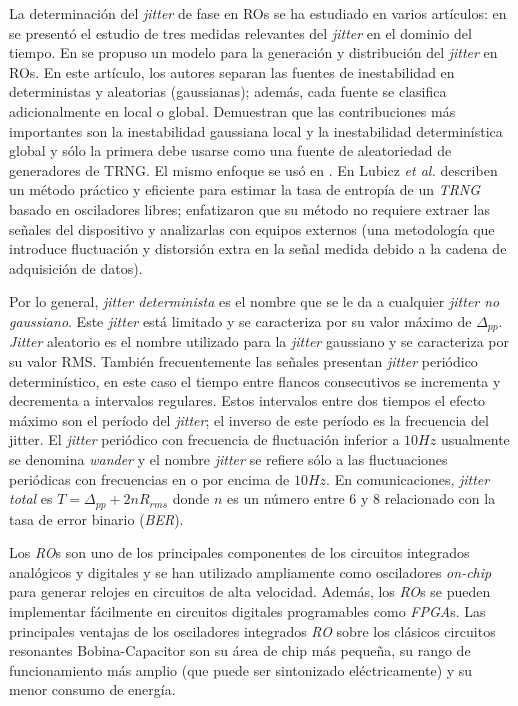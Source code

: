 La determinación del \textit{jitter} de fase en ROs se ha estudiado en varios artículos: en \cite{McNeill1997} se presentó el estudio de tres medidas relevantes del \textit{jitter} en el dominio del tiempo.
En \cite{Valtchanov2008} se propuso un modelo para la generación y distribución del \textit{jitter} en ROs.
En este artículo, los autores separan las fuentes de inestabilidad en deterministas y aleatorias (gaussianas); además, cada fuente se clasifica adicionalmente en local o global.
Demuestran que las contribuciones más importantes son la inestabilidad gaussiana local y la inestabilidad determinística global y sólo la primera debe usarse como una fuente de aleatoriedad de generadores de TRNG.
El mismo enfoque se usó en \cite{Fischer2008, Valtchanov2010, Baudet2011, Jessa2011}.
En \cite{Lubicz2014} Lubicz \textit{et al.} describen un método práctico y eficiente para estimar la tasa de entropía de un \emph{TRNG} basado en osciladores libres; enfatizaron que su método no requiere extraer las señales del dispositivo y analizarlas con equipos externos (una metodología que introduce fluctuación y distorsión extra en la señal medida debido a la cadena de adquisición de datos).

Por lo general, \emph{jitter determinista} es el nombre que se le da a cualquier \emph{jitter no gaussiano}.
Este \emph{jitter} está limitado y se caracteriza por su valor máximo de $\Delta_{pp}$.
\textit{Jitter} aleatorio es el nombre utilizado para la \textit{jitter} gaussiano y se caracteriza por su valor RMS.
También frecuentemente las señales presentan \textit{jitter} periódico determinístico, en este caso el tiempo entre flancos consecutivos se incrementa y decrementa a intervalos regulares.
Estos intervalos entre dos tiempos el efecto máximo son el período del \textit{jitter}; el inverso de este período  es la frecuencia del jitter.
El \textit{jitter} periódico con frecuencia de fluctuación inferior a $10 Hz$ usualmente se denomina \emph{wander} y el nombre \emph{jitter} se refiere sólo a las fluctuaciones periódicas con frecuencias en o por encima de $10 Hz$.
En comunicaciones, \emph{jitter total} es $T = \Delta_{pp} + 2nR_{rms}$ donde $n$ es un número entre $6$ y $8$ relacionado con la tasa de error binario (\emph{BER}).

Los \emph{RO}s son uno de los principales componentes de los circuitos integrados analógicos y digitales y se han utilizado ampliamente como osciladores \emph{on-chip} para generar relojes en circuitos de alta velocidad.
Además, los \emph{RO}s se pueden implementar fácilmente en circuitos digitales programables como \emph{FPGA}s.
Las principales ventajas de los osciladores integrados \emph{RO} sobre los clásicos circuitos resonantes Bobina-Capacitor son su área de chip más pequeña, su rango de funcionamiento más amplio (que puede ser sintonizado eléctricamente) y su menor consumo de energía.

